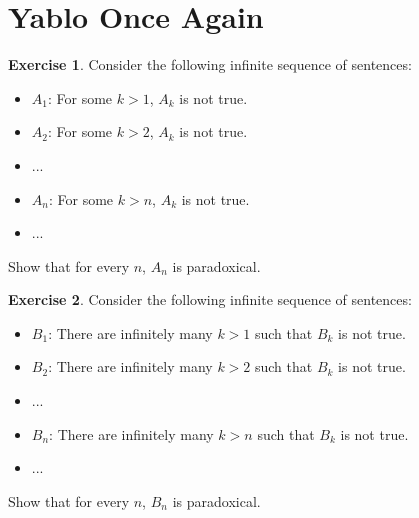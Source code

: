 \documentclass[11pt]{article}
\theoremstyle{definition}
\newtheorem{exer}{Exercise}
\begin{document}
\section{Yablo Once Again}

\begin{exer}
Consider the following infinite sequence of sentences:
\begin{itemize}
    \item [] $A_1$: For some $k > 1$,  $A_k$ is not true.
    \item [] $A_2$: For some $k > 2$,  $A_k$ is not true.
    \item [] ...
    \item [] $A_n$: For some $k > n$, $A_k$ is not true.
    \item [] ...
\end{itemize}
Show that for every $n$, $A_n$ is paradoxical.
\end{exer}

\begin{exer}
Consider the following infinite sequence of sentences:
\begin{itemize}
    \item [] $B_1$: There are infinitely many $k > 1$ such that $B_k$ is not true.
    \item [] $B_2$: There are infinitely many $k > 2$ such that $B_k$ is not true.
    \item [] ...
    \item [] $B_n$: There are infinitely many $k > n$ such that $B_k$ is not true.
    \item [] ...
\end{itemize}
Show that for every $n$, $B_n$ is paradoxical.
\end{exer}
\end{document}
